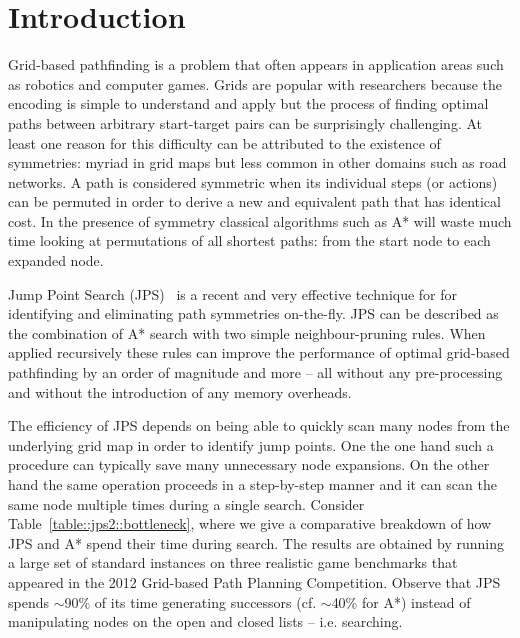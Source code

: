\section{Introduction}
\label{cha::jps2::introduction}
Grid-based pathfinding is a problem that often
appears in application areas such as robotics and computer games. 
Grids are popular with researchers because the encoding is
simple to understand and apply but the process of finding optimal paths
between arbitrary start-target pairs can be surprisingly challenging. At least
one reason for this difficulty can be attributed to the existence of 
symmetries: myriad in grid maps but less common in other domains such as
road networks. A path is considered symmetric when its individual steps 
(or actions) can be permuted in order to derive a new and equivalent path
that has identical cost.
In the presence of symmetry classical algorithms such as A* will waste much 
time looking at permutations of all shortest paths: from the start node to each expanded node.

Jump Point Search (JPS)~\cite{harabor11b} is a recent and very effective 
technique for for identifying and eliminating path symmetries on-the-fly. 
JPS can be described as the combination of A* search with two simple 
neighbour-pruning rules. When applied recursively these rules
can improve the performance of optimal grid-based pathfinding by an order of 
magnitude and more -- all without any pre-processing and without the 
introduction of any memory overheads.


The efficiency of JPS depends on being able to quickly scan many nodes
from the underlying grid map in order to identify jump points.
One the one hand such a procedure can typically save many unnecessary
node expansions. On the other hand the same operation proceeds in a 
step-by-step manner and it can scan the same node multiple times during 
a single search. 
Consider Table~\ref{table::jps2::bottleneck}, where we give a comparative
breakdown of how JPS and A{*} spend their time during search.
The results are obtained by running
a large set of standard instances on three realistic game benchmarks
that appeared in the 2012 Grid-based Path Planning Competition. Observe that
JPS spends $\sim$90\% of its time generating successors (cf. $\sim$40\% for
A{*}) instead of manipulating nodes on the open and closed lists -- i.e.
searching.


